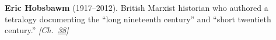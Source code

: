 \textbf{Eric Hobsbawm} (1917–2012). British Marxist historian who authored a tetralogy documenting the ``long nineteenth century'' and ``short twentieth century.'' \emph{[Ch.~\hyperref[ch:christmastruce1914]{38}]}

